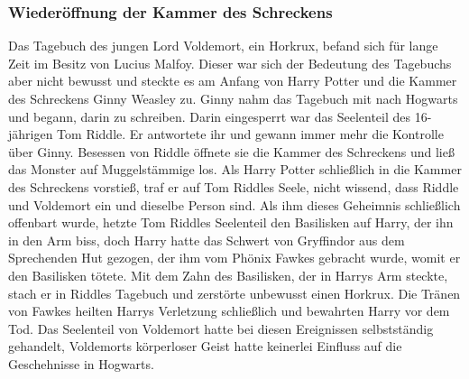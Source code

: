 \documentclass[a4paper, 10pt]{article}
\begin{document}
\subsubsection*{\large Wiederöffnung der Kammer des Schreckens}
Das Tagebuch des jungen Lord Voldemort, ein Horkrux, befand sich für lange Zeit im Besitz von Lucius Malfoy. Dieser war sich der Bedeutung des Tagebuchs aber nicht bewusst und steckte es am Anfang von Harry Potter und die Kammer des Schreckens Ginny Weasley zu.
\vspace{10pt}
\newline
{}  
Ginny nahm das Tagebuch mit nach Hogwarts und begann, darin zu schreiben. Darin eingesperrt war das Seelenteil des 16-jährigen Tom Riddle. Er antwortete ihr und gewann immer mehr die Kontrolle über Ginny. Besessen von Riddle öffnete sie die Kammer des Schreckens und ließ das Monster auf Muggelstämmige los.
\vspace{10pt}
\newline
{}  
Als Harry Potter schließlich in die Kammer des Schreckens vorstieß, traf er auf Tom Riddles Seele, nicht wissend, dass Riddle und Voldemort ein und dieselbe Person sind. Als ihm dieses Geheimnis schließlich offenbart wurde, hetzte Tom Riddles Seelenteil den Basilisken auf Harry, der ihn in den Arm biss, doch Harry hatte das Schwert von Gryffindor aus dem Sprechenden Hut gezogen, der ihm vom Phönix Fawkes gebracht wurde, womit er den Basilisken tötete. Mit dem Zahn des Basilisken, der in Harrys Arm steckte, stach er in Riddles Tagebuch und zerstörte unbewusst einen Horkrux. Die Tränen von Fawkes heilten Harrys Verletzung schließlich und bewahrten Harry vor dem Tod.
\vspace{10pt}
\newline
{}  
Das Seelenteil von Voldemort hatte bei diesen Ereignissen selbstständig gehandelt, Voldemorts körperloser Geist hatte keinerlei Einfluss auf die Geschehnisse in Hogwarts.
\end{document}
